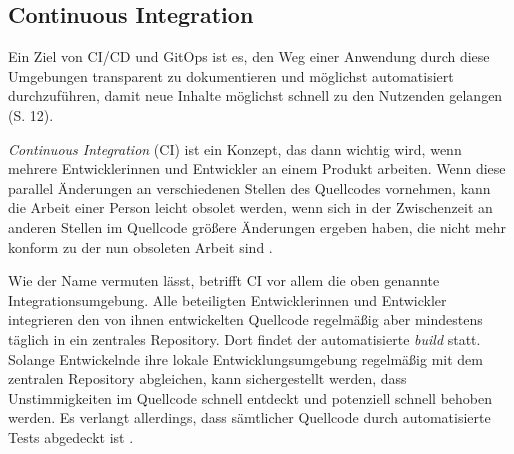 \documentclass[11pt,a4paper]{article}
\begin{document}
\subsection{Continuous Integration}
Ein Ziel von CI/CD und GitOps ist es, den Weg einer Anwendung durch
diese Umgebungen transparent zu dokumentieren und möglichst automatisiert
durchzuführen, damit neue Inhalte möglichst schnell zu den
Nutzenden gelangen \cite{cicd_with_kubernetes_devops} (S. 12).

\emph{Continuous Integration} (CI) ist ein Konzept, das dann wichtig wird, wenn mehrere
Entwicklerinnen und Entwickler an einem Produkt arbeiten.
Wenn diese parallel Änderungen an verschiedenen Stellen des Quellcodes
vornehmen, kann die Arbeit einer Person leicht obsolet werden,
wenn sich in der Zwischenzeit an anderen Stellen im Quellcode größere
Änderungen ergeben haben, die nicht mehr konform zu der nun obsoleten Arbeit sind \cite{fowler_Continuous_Integration}.

Wie der Name vermuten lässt, betrifft CI vor allem die oben genannte Integrationsumgebung.
Alle beteiligten Entwicklerinnen und Entwickler integrieren den von ihnen
entwickelten Quellcode regelmäßig aber mindestens täglich in ein zentrales
Repository. Dort findet der automatisierte \emph{build} statt.
Solange Entwickelnde ihre lokale Entwicklungsumgebung regelmäßig mit dem
zentralen Repository abgleichen, kann sichergestellt werden, dass
Unstimmigkeiten im Quellcode schnell entdeckt und potenziell schnell behoben werden.
Es verlangt allerdings, dass sämtlicher Quellcode durch automatisierte
Tests abgedeckt ist \cite{fowler_Continuous_Integration}.
\end{document}
